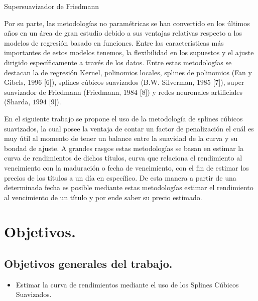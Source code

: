 Supersuavizador de Friedmann




\newpage



\hspace*{0.4 cm} Por su parte, las metodolog\'ias no param\'etricas se han convertido en los \'ultimos a\~nos en un
\'area de gran estudio debido a sus ventajas relativas respecto a los modelos de regresi\'on basado en funciones. Entre las caracter\'isticas m\'as importantes de estos modelos tenemos, la flexibilidad en los supuestos y el ajuste dirigido espec\'ificamente a trav\'es de los datos. Entre estas metodolog\'ias se destacan la de regresi\'on Kernel, polinomios locales, splines de polinomios (Fan y Gibels, $1996$ [6]), splines c\'ubicos suavizados (B.W. Silverman, $1985$ [7]), super suavizador de Friedmann (Friedmann, $1984$ [8]) y redes neuronales artificiales (Sharda, $1994$ [9]).

\vspace{0.5cm}

\hspace*{0.4 cm} En el siguiente trabajo se propone el uso de la metodolog\'ia de splines c\'ubicos suavizados, la cual posee la ventaja de contar un factor de penalizaci\'on el cu\'al es muy \'util al momento de tener un balance entre la suavidad de la curva y su bondad de ajuste. A grandes rasgos estas metodolog\'ias se basan en estimar la curva de rendimientos de dichos t\'itulos, curva que relaciona el rendimiento al vencimiento con la maduraci\'on o fecha de vencimiento, con el fin de estimar los precios de los t\'itulos a un d\'ia en espec\'ifico. De esta manera a partir de una determinada fecha es posible mediante estas metodolog\'ias estimar el rendimiento al vencimiento de un t\'itulo y por ende saber su precio estimado.

\newpage

\section{Objetivos.}

\subsection{Objetivos  generales del trabajo.}

\begin{itemize}
  \item Estimar la curva de rendimientos mediante el uso de los Splines C\'ubicos Suavizados.
\end{itemize}

